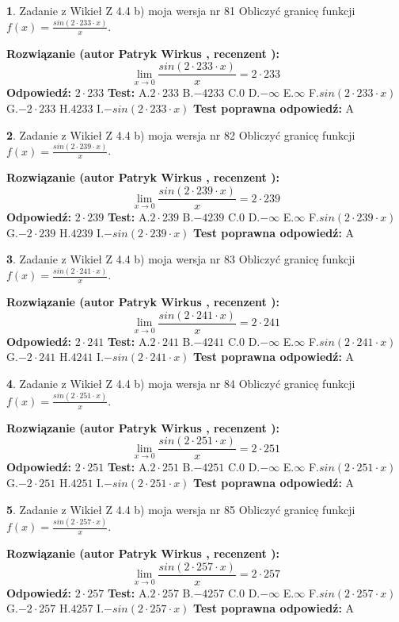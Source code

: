 \documentclass[12pt, a4paper]{article}
\theoremstyle{definition} %
\newtheorem{zad}{}
\newcommand{\zadStart}[1]{\begin{zad}#1\newline}
\newcommand{\zadStop}{\end{zad}}
\newcommand{\rozwStart}[2]{\noindent \textbf{Rozwiązanie (autor #1 , recenzent #2): }\newline}
\newcommand{\rozwStop}{\newline}
\newcommand{\odpStart}{\noindent \textbf{Odpowiedź:}\newline}
\newcommand{\odpStop}{\newline}
\newcommand{\testStart}{\noindent \textbf{Test:}\newline}
\newcommand{\testStop}{\newline}
\newcommand{\kluczStart}{\noindent \textbf{Test poprawna odpowiedź:}\newline}
\newcommand{\kluczStop}{\newline}
\begin{document}
\zadStart{Zadanie z Wikieł Z 4.4 b) moja wersja nr 81}
Obliczyć granicę funkcji $f(x)=\frac{sin(2 \cdot233\cdot x)}{x}$.
\zadStop
\rozwStart{Patryk Wirkus}{}
$$\lim\limits_{x\to 0}\frac{sin(2 \cdot 233\cdot x)}{x}=
2 \cdot 233$$
\rozwStop
\odpStart
$2 \cdot 233$
\odpStop
\testStart
A.$2 \cdot 233$
B.$-4233$
C.$0$
D.$-\infty$
E.$\infty$
F.$sin(2 \cdot 233\cdot x)$
G.$-2 \cdot 233$
H.$4233$
I.$-sin(2 \cdot 233\cdot x)$
\testStop
\kluczStart
A
\kluczStop



\zadStart{Zadanie z Wikieł Z 4.4 b) moja wersja nr 82}
Obliczyć granicę funkcji $f(x)=\frac{sin(2 \cdot239\cdot x)}{x}$.
\zadStop
\rozwStart{Patryk Wirkus}{}
$$\lim\limits_{x\to 0}\frac{sin(2 \cdot 239\cdot x)}{x}=
2 \cdot 239$$
\rozwStop
\odpStart
$2 \cdot 239$
\odpStop
\testStart
A.$2 \cdot 239$
B.$-4239$
C.$0$
D.$-\infty$
E.$\infty$
F.$sin(2 \cdot 239\cdot x)$
G.$-2 \cdot 239$
H.$4239$
I.$-sin(2 \cdot 239\cdot x)$
\testStop
\kluczStart
A
\kluczStop



\zadStart{Zadanie z Wikieł Z 4.4 b) moja wersja nr 83}
Obliczyć granicę funkcji $f(x)=\frac{sin(2 \cdot241\cdot x)}{x}$.
\zadStop
\rozwStart{Patryk Wirkus}{}
$$\lim\limits_{x\to 0}\frac{sin(2 \cdot 241\cdot x)}{x}=
2 \cdot 241$$
\rozwStop
\odpStart
$2 \cdot 241$
\odpStop
\testStart
A.$2 \cdot 241$
B.$-4241$
C.$0$
D.$-\infty$
E.$\infty$
F.$sin(2 \cdot 241\cdot x)$
G.$-2 \cdot 241$
H.$4241$
I.$-sin(2 \cdot 241\cdot x)$
\testStop
\kluczStart
A
\kluczStop



\zadStart{Zadanie z Wikieł Z 4.4 b) moja wersja nr 84}
Obliczyć granicę funkcji $f(x)=\frac{sin(2 \cdot251\cdot x)}{x}$.
\zadStop
\rozwStart{Patryk Wirkus}{}
$$\lim\limits_{x\to 0}\frac{sin(2 \cdot 251\cdot x)}{x}=
2 \cdot 251$$
\rozwStop
\odpStart
$2 \cdot 251$
\odpStop
\testStart
A.$2 \cdot 251$
B.$-4251$
C.$0$
D.$-\infty$
E.$\infty$
F.$sin(2 \cdot 251\cdot x)$
G.$-2 \cdot 251$
H.$4251$
I.$-sin(2 \cdot 251\cdot x)$
\testStop
\kluczStart
A
\kluczStop



\zadStart{Zadanie z Wikieł Z 4.4 b) moja wersja nr 85}
Obliczyć granicę funkcji $f(x)=\frac{sin(2 \cdot257\cdot x)}{x}$.
\zadStop
\rozwStart{Patryk Wirkus}{}
$$\lim\limits_{x\to 0}\frac{sin(2 \cdot 257\cdot x)}{x}=
2 \cdot 257$$
\rozwStop
\odpStart
$2 \cdot 257$
\odpStop
\testStart
A.$2 \cdot 257$
B.$-4257$
C.$0$
D.$-\infty$
E.$\infty$
F.$sin(2 \cdot 257\cdot x)$
G.$-2 \cdot 257$
H.$4257$
I.$-sin(2 \cdot 257\cdot x)$
\testStop
\kluczStart
A
\kluczStop
\end{document}
